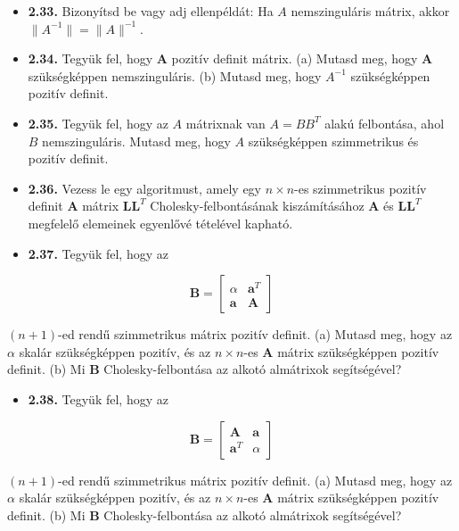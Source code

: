 \documentclass[
  magyar,
  11pt]{article}
\providecommand{\tightlist}{%
  \setlength{\itemsep}{0pt}\setlength{\parskip}{0pt}}
\providecommand{\boldsymbol}[1]{\mathbf{#1}}
\begin{document}
\begin{itemize}
\tightlist
\item
  \textbf{2.33.} Bizonyítsd be vagy adj ellenpéldát: Ha \(A\)
  nemszinguláris mátrix, akkor \(\|A^{-1}\| = \|A\|^{-1}\).
\item
  \textbf{2.34.} Tegyük fel, hogy \(\boldsymbol{A}\) pozitív definit
  mátrix. (a) Mutasd meg, hogy \(\boldsymbol{A}\) szükségképpen
  nemszinguláris. (b) Mutasd meg, hogy \(A^{-1}\) szükségképpen pozitív
  definit.
\item
  \textbf{2.35.} Tegyük fel, hogy az \(A\) mátrixnak van \(A = BB^T\)
  alakú felbontása, ahol \(B\) nemszinguláris. Mutasd meg, hogy \(A\)
  szükségképpen szimmetrikus és pozitív definit.
\item
  \textbf{2.36.} Vezess le egy algoritmust, amely egy \(n \times n\)-es
  szimmetrikus pozitív definit \(\boldsymbol{A}\) mátrix
  \(\boldsymbol{L}\boldsymbol{L}^T\) Cholesky-felbontásának
  kiszámításához \(\boldsymbol{A}\) és
  \(\boldsymbol{L}\boldsymbol{L}^T\) megfelelő elemeinek egyenlővé
  tételével kapható.
\item
  \textbf{2.37.} Tegyük fel, hogy az
\end{itemize}

\[\boldsymbol{B} = \begin{bmatrix} \alpha & \boldsymbol{a}^T \\ \boldsymbol{a} & \boldsymbol{A} \end{bmatrix}\]

\((n+1)\)-ed rendű szimmetrikus mátrix pozitív definit. (a) Mutasd meg,
hogy az \(\alpha\) skalár szükségképpen pozitív, és az \(n \times n\)-es
\(\boldsymbol{A}\) mátrix szükségképpen pozitív definit. (b) Mi
\(\boldsymbol{B}\) Cholesky-felbontása az alkotó almátrixok
segítségével?

\begin{itemize}
\tightlist
\item
  \textbf{2.38.} Tegyük fel, hogy az
\end{itemize}

\[\boldsymbol{B} = \begin{bmatrix} \boldsymbol{A} & \boldsymbol{a} \\ \boldsymbol{a}^T & \alpha \end{bmatrix}\]

\((n+1)\)-ed rendű szimmetrikus mátrix pozitív definit. (a) Mutasd meg,
hogy az \(\alpha\) skalár szükségképpen pozitív, és az \(n \times n\)-es
\(\boldsymbol{A}\) mátrix szükségképpen pozitív definit. (b) Mi
\(\boldsymbol{B}\) Cholesky-felbontása az alkotó almátrixok
segítségével?
\end{document}
